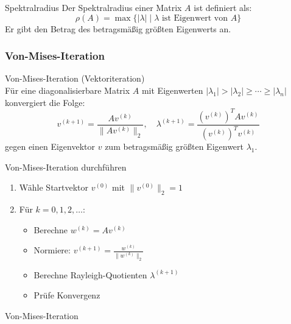 \begin{definition}{Spektralradius}
Der Spektralradius einer Matrix $A$ ist definiert als:
$$\rho(A) = \max\{|\lambda| \mid \lambda \text{ ist Eigenwert von } A\}$$
Er gibt den Betrag des betragsmäßig größten Eigenwerts an.
\end{definition}

\subsubsection{Von-Mises-Iteration}

\begin{concept}{Von-Mises-Iteration (Vektoriteration)}\\
Für eine diagonalisierbare Matrix $A$ mit Eigenwerten $|\lambda_1| > |\lambda_2| \geq \cdots \geq |\lambda_n|$ konvergiert die Folge:
$$v^{(k+1)} = \frac{Av^{(k)}}{\|Av^{(k)}\|_2}, \quad
\lambda^{(k+1)} = \frac{(v^{(k)})^TAv^{(k)}}{(v^{(k)})^Tv^{(k)}}$$
gegen einen Eigenvektor $v$ zum betragsmäßig größten Eigenwert $\lambda_1$.
\end{concept}

\begin{KR}{Von-Mises-Iteration durchführen}
\begin{enumerate}
    \item Wähle Startvektor $v^{(0)}$ mit $\|v^{(0)}\|_2 = 1$
    \item Für $k = 0,1,2,\ldots$:
    \begin{itemize}
        \item Berechne $w^{(k)} = Av^{(k)}$
        \item Normiere: $v^{(k+1)} = \frac{w^{(k)}}{\|w^{(k)}\|_2}$
        \item Berechne Rayleigh-Quotienten $\lambda^{(k+1)}$
        \item Prüfe Konvergenz
    \end{itemize}
\end{enumerate}
\end{KR}

\begin{example2}{Von-Mises-Iteration}
\end{example2}

